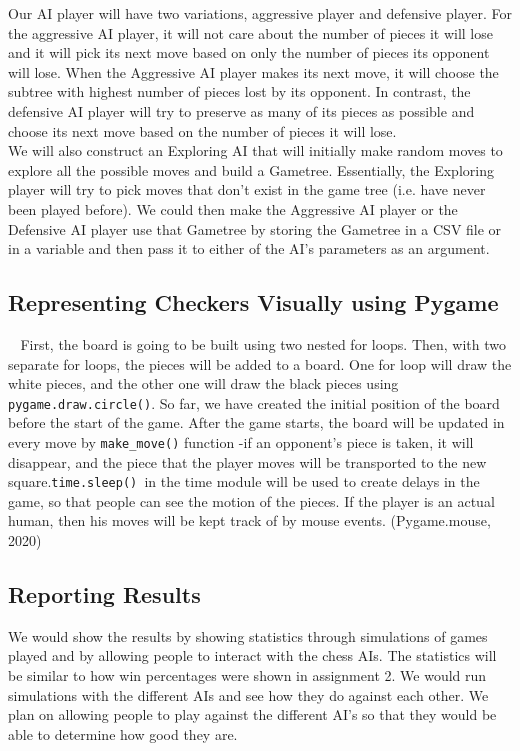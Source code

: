 \documentclass[fontsize=11pt]{article}
\begin{document}
Our AI player will have two variations, aggressive player and defensive player. For the aggressive AI player, it will not care about the number of pieces it will lose and it will pick its next move based on only the number of pieces its opponent will lose. When the Aggressive AI player makes its next move, it will choose the subtree with highest number of pieces lost by its opponent. In contrast, the defensive AI player will try to preserve as many of its pieces as possible and choose its next move based on the number of pieces it will lose.\\

We will also construct an Exploring AI that will initially make random moves to explore all the possible moves and build a Gametree. Essentially, the Exploring player will try to pick moves that don't exist in the game tree (i.e. have never been played before). We could then make the Aggressive AI player or the Defensive AI player use that Gametree by storing the Gametree in a CSV file or in a variable and then pass it to either of the AI’s parameters as an argument.


\subsection*{Representing Checkers Visually using Pygame}

$~~~~$First, the board is going to be built using two nested for loops. Then, with two separate for loops, the pieces will be added to a board. One for loop will draw the white pieces, and the other one will draw the black pieces using \texttt{pygame.draw.circle()}. So far, we have created the initial position of the board before the start of the game. After the game starts, the board will be updated in every move by \texttt{make\_move()} function -if an opponent’s piece is taken, it will disappear, and the piece that the player moves will be transported to the new square.\texttt{time.sleep() }in the time module will be used to create delays in the game, so that people can see the motion of the pieces. If the player is an actual human, then his moves will be kept track of by mouse events. (Pygame.mouse, 2020)\\

\subsection*{Reporting Results}

We would show the results by showing statistics through simulations of games played and by allowing people to interact with the chess AIs. The statistics will be similar to how win percentages were shown in assignment 2. We would run simulations with the different AIs and see how they do against each other. We plan on allowing people to play against the different AI’s so that they would be able to determine how good they are.
\end{document}

